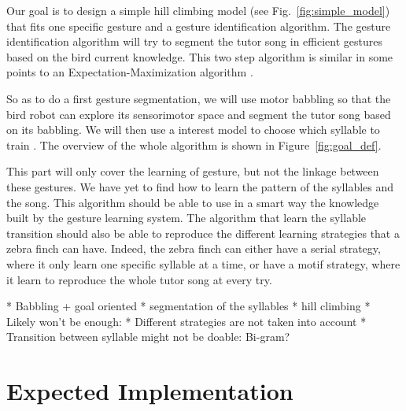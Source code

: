 \documentclass[a4paper, 11pt]{article}
\begin{document}
Our goal is to design a simple hill climbing model (see
Fig.~\ref{fig:simple_model}) that fits one specific gesture and a gesture
identification algorithm. The gesture identification algorithm will try to
segment the tutor song in efficient gestures based on the bird current
knowledge. This two step algorithm is similar in some points to an
Expectation-Maximization algorithm \parencite{dempster_maximum_1977}.

So as to do a first gesture segmentation, we will use motor babbling so that the
bird robot can explore its sensorimotor space and segment the tutor song based
on its babbling. We will then use a interest model to choose which syllable to
train \parencite{baranes_active_2013}. The overview of the whole algorithm is
shown in Figure~\ref{fig:goal_def}.

This part will only cover the learning of gesture, but not the linkage between
these gestures. We have yet to find how to learn the pattern of the syllables
and the song. This algorithm should be able to use in a smart way the knowledge
built by the gesture learning system. The algorithm that learn the syllable
transition should also be able to reproduce the different learning strategies
that a zebra finch can have. Indeed, the zebra finch can either have a serial
strategy, where it only learn one specific syllable at a time, or have a motif
strategy, where it learn to reproduce the whole tutor song at every try.

\begin{figure}[tb]
\end{figure}
\begin{figure}[tb]
\end{figure}

\ifx
* Babbling + goal oriented
* segmentation of the syllables
* hill climbing
* Likely won't be enough:
  * Different strategies are not taken into account
  * Transition between syllable might not be doable: Bi-gram?
\fi

\section*{Expected Implementation}
\end{document}
